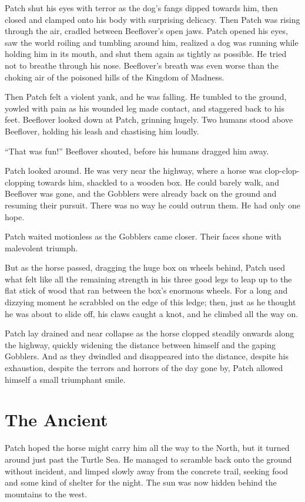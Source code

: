 \documentclass[ebook,oneside,openany,17pt]{memoir}
\renewcommand{\thechapter}{\Roman{chapter}}
\newcounter{sections}
\newcommand{\sections}[1]{%
  \section*{#1}
  \addtocounter{sections}{1}%
  \pdfbookmark[1]{#1}{section.\thechapter.\thesections}}
\begin{document}
Patch shut his eyes with terror as the dog’s fangs dipped towards him,
then closed and clamped onto his body with surprising delicacy. Then
Patch was rising through the air, cradled between Beeflover’s open
jaws. Patch opened his eyes, saw the world roiling and tumbling around
him, realized a dog was running while holding him in its mouth, and
shut them again as tightly as possible. He tried not to breathe
through his nose. Beeflover’s breath was even worse than the choking
air of the poisoned hills of the Kingdom of Madness.

Then Patch felt a violent yank, and he was falling. He tumbled to the
ground, yowled with pain as his wounded leg made contact, and
staggered back to his feet. Beeflover looked down at Patch, grinning
hugely. Two humans stood above Beeflover, holding his leash and
chastising him loudly.

“That was fun!” Beeflover shouted, before his humans dragged him away.

Patch looked around. He was very near the highway, where a horse was
clop-clop-clopping towards him, shackled to a wooden box. He could
barely walk, and Beeflover was gone, and the Gobblers were already
back on the ground and resuming their pursuit. There was no way he
could outrun them. He had only one hope.

Patch waited motionless as the Gobblers came closer. Their faces shone
with malevolent triumph.

But as the horse passed, dragging the huge box on wheels behind, Patch
used what felt like all the remaining strength in his three good legs
to leap up to the flat stick of wood that ran between the box’s
enormous wheels. For a long and dizzying moment he scrabbled on the
edge of this ledge; then, just as he thought he was about to slide
off, his claws caught a knot, and he climbed all the way on.

Patch lay drained and near collapse as the horse clopped steadily
onwards along the highway, quickly widening the distance between
himself and the gaping Gobblers. And as they dwindled and disappeared
into the distance, despite his exhaustion, despite the terrors and
horrors of the day gone by, Patch allowed himself a small triumphant
smile.


\sections{The Ancient}

Patch hoped the horse might carry him all the way to the North, but it
turned around just past the Turtle Sea. He managed to scramble back
onto the ground without incident, and limped slowly away from the
concrete trail, seeking food and some kind of shelter for the
night. The sun was now hidden behind the mountains to the west.
\end{document}
